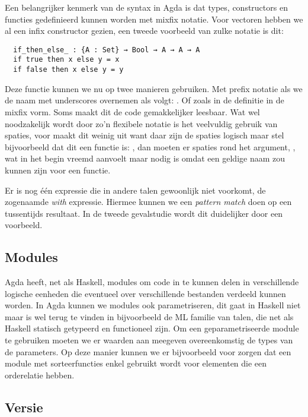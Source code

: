 Een belangrijker kenmerk van de syntax in Agda is dat types, constructors en
functies gedefinieerd kunnen worden met mixfix notatie. Voor vectoren hebben we
al een infix constructor gezien, een tweede voorbeeld van zulke notatie is dit:

\begin{verbatim}
  if_then_else_ : {A : Set} → Bool → A → A → A
  if true then x else y = x
  if false then x else y = y
\end{verbatim}

Deze functie kunnen we nu op twee manieren gebruiken. Met prefix notatie als we
de naam met underscores overnemen als volgt: . Of
zoals in de definitie in de mixfix vorm. Soms maakt dit de code gemakkelijker
leesbaar. Wat wel noodzakelijk wordt door zo'n flexibele notatie is het
veelvuldig gebruik van spaties, voor  maakt dit weinig uit
want daar zijn de spaties logisch maar stel bijvoorbeeld dat dit een functie
is: \iagda{[_]}, dan moeten er spaties rond het argument, \iagda{[ x ]}, wat in
het begin vreemd aanvoelt maar nodig is omdat \iagda{[x]} een geldige naam zou
kunnen zijn voor een functie.

Er is nog één expressie die in andere talen gewoonlijk niet voorkomt, de
zogenaamde \emph{with} expressie. Hiermee kunnen we een \emph{pattern match}
doen op een tussentijds resultaat. In de tweede gevalstudie wordt dit
duidelijker door een voorbeeld.

\subsection{Modules}

Agda heeft, net als Haskell, modules om code in te kunnen delen in verschillende
logische eenheden die eventueel over verschillende bestanden verdeeld kunnen
worden. In Agda kunnen we modules ook parametriseren, dit gaat in Haskell niet
maar is wel terug te vinden in bijvoorbeeld de ML \cite{sml} \cite{ocaml} familie
van talen, die net als Haskell statisch getypeerd en functioneel zijn. Om een
geparametriseerde module te gebruiken moeten we er waarden aan meegeven
overeenkomstig de types van de parameters. Op deze manier kunnen we er
bijvoorbeeld voor zorgen dat een module met sorteerfuncties enkel gebruikt
wordt voor elementen die een orderelatie hebben.

\subsection{Versie}

